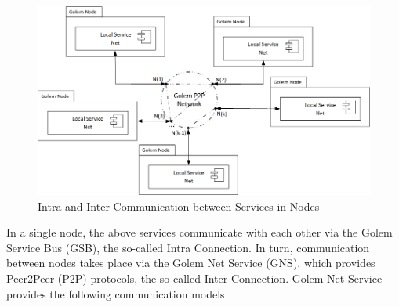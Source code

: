 \begin{figure}[H]
    \centering
    \includegraphics[width=14cm,angle=0]{./diag/Reference/CommunicationConcept-Reference.png}
	\caption{Intra and Inter Communication between Services in Nodes}
    \label{fig:CCR}
\end{figure}


In a single node, the above services communicate with each other via the Golem Service Bus (GSB), the so-called Intra Connection.
In turn, communication between nodes takes place via the Golem Net Service (GNS), which provides Peer2Peer (P2P) protocols, the so-called Inter Connection.
Golem Net Service provides the following communication models

